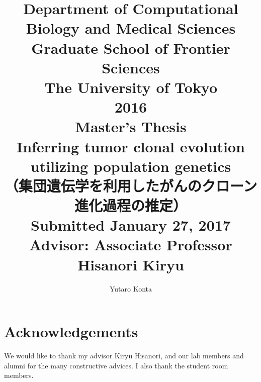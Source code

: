 \documentclass[12pt]{article}
\begin{document}
\title{{\large Department of Computational Biology and Medical Sciences\\Graduate School of Frontier Sciences\\The University of Tokyo}\vspace{4cm}\\2016\\Master's Thesis\vspace{1cm}\\Inferring tumor clonal evolution utilizing population genetics\\（集団遺伝学を利用したがんのクローン進化過程の推定）\vspace{3cm}\\{\large Submitted January 27, 2017\\Advisor: Associate Professor Hisanori Kiryu}\vspace{3cm}}
\author{{\Large Yutaro Konta}}
\date{}
\maketitle
\thispagestyle{empty}
\newpage



\newpage
\tableofcontents
\newpage













\section*{Acknowledgements}
We would like to thank my advisor Kiryu Hisanori, and our lab members and alumni for the many constructive advices.
I also thank the student room members.


\end{document}
